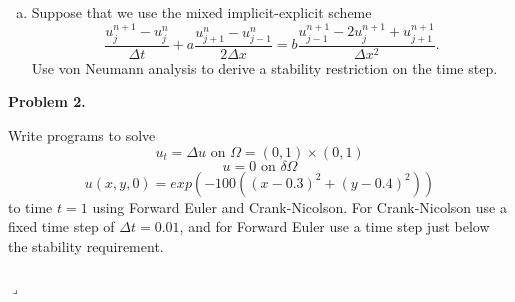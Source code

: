 \documentclass[12pt]{article}
\newenvironment{myprob}[1]
    {%
    \noindent{\Huge$\ulcorner$}\textbf{#1.}\begin{em}
    }
    { 
    \end{em} \\ \hphantom{l} \hfill {\Huge$\lrcorner$} }
\begin{document}
\begin{enumerate}[(a)]
\item Suppose that we use the mixed implicit-explicit scheme
$$\dfrac{u_j^{n+1}-u_j^n}{\Delta t} + a \dfrac{u_{j+1}^n - u_{j-1}^n}{2\Delta x} = b \dfrac{u_{j-1}^{n+1} - 2u_j^{n+1} + u_{j+1}^{n+1}}{\Delta x^2}.$$
Use von Neumann analysis to derive a stability restriction on the time step.
\end{enumerate}

\begin{myprob}{Problem 2}
Write programs to solve
$$u_t = \Delta u \text{ on } \Omega = (0,1) \times (0,1)$$
$$u=0 \text{ on } \delta \Omega$$
$$u(x,y,0) = exp(-100((x-0.3)^2+(y-0.4)^2))$$
to time $t=1$ using Forward Euler and Crank-Nicolson.  For Crank-Nicolson use a fixed time step of $\Delta t = 0.01$, and for Forward Euler use a time step just below the stability requirement.
\end{myprob}
\end{document}
